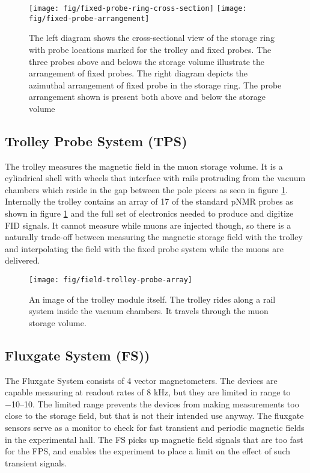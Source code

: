 \begin{figure}
\label{fig:fixed-probe-arrangement}
\centering
\texttt{[image: fig/fixed-probe-ring-cross-section]}
\texttt{[image: fig/fixed-probe-arrangement]}
\caption{The left diagram shows the cross-sectional view of the storage ring with probe locations marked for the trolley and fixed probes.  The three probes above and belows the storage volume illustrate the arrangement of fixed probes.  The right diagram depicts the azimuthal arrangement of fixed probe in the storage ring. The probe arrangement shown is present both above and below the storage volume}
\end{figure}

\subsection{Trolley Probe System (TPS)}

The trolley measures the magnetic field in the muon storage volume.  It is a cylindrical shell with wheels that interface with rails protruding from the vacuum chambers which reside in the gap between the pole pieces as seen in figure \ref{fig:fixed-probe-arrangement}.  Internally the trolley contains an array of 17 of the standard pNMR probes as shown in figure \ref{fig:fixed-probe-arrangement} and the full set of electronics needed to produce and digitize FID signals.  It cannot measure while muons are injected though, so there is a naturally trade-off between measuring the magnetic storage field with the trolley and interpolating the field with the fixed probe system while the muons are delivered.

\begin{figure}
\label{fig:field-trolley-probe-array}
\centering
\texttt{[image: fig/field-trolley-probe-array]}
\caption{An image of the trolley module itself.  The trolley rides along a rail system inside the vacuum chambers.  It travels through the muon storage volume.}
\end{figure}

\subsection{Fluxgate System (FS))}

The Fluxgate System consists of 4 vector magnetometers.  The devices are capable measuring at readout rates of 8 kHz, but they are limited in range to \SIrange{-10}{+10}{\gauss}.  The limited range prevents the devices from making measurements too close to the storage field, but that is not their intended use anyway.  The fluxgate sensors serve as a monitor to check for fast transient and periodic magnetic fields in the experimental hall.  The FS picks up magnetic field signals that are too fast for the FPS, and enables the experiment to place a limit on the effect of such transient signals.

